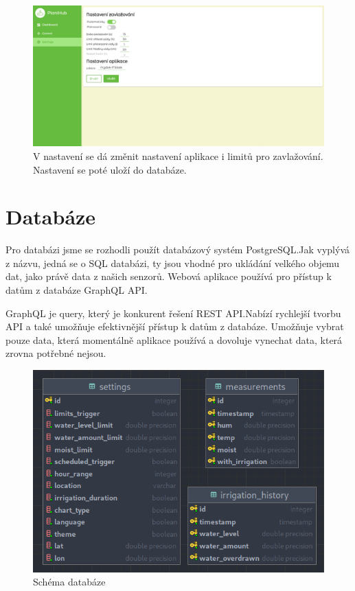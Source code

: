 \documentclass[12pt,a4paper]{article}
\begin{document}
\begin{figure}[h]
	\centering
	\includegraphics[width=\linewidth]{web-ui-settings.png}
	\caption{V nastavení se dá změnit nastavení aplikace i limitů pro
		zavlažování. Nastavení se poté uloží do databáze.}
\end{figure}

\clearpage

\section{Databáze}

Pro databázi jsme se rozhodli použít databázový systém PostgreSQL.\@ Jak vyplývá z názvu, jedná se o SQL databázi, ty jsou vhodné pro ukládání velkého objemu dat, jako právě data z našich senzorů. Webová aplikace používá pro přístup k datům z databáze GraphQL API.\@

GraphQL je query, který je konkurent řešení REST API.\@ Nabízí rychlejší tvorbu API a také umožňuje efektivnější přístup k datům z databáze. Umožňuje vybrat pouze data, která momentálně aplikace používá a dovoluje vynechat data, která zrovna potřebné nejsou.

\begin{figure}[h]
	\centering
	\includegraphics[width=0.9\linewidth]{db.png}
	\caption{Schéma databáze}
\end{figure}
\end{document}
